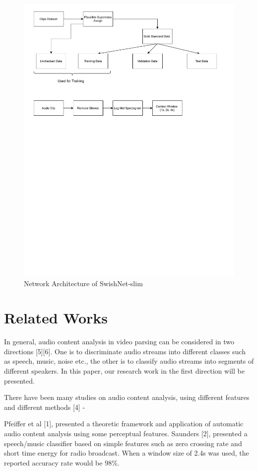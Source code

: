 \documentclass{article}
\begin{document}
\begin{figure}[!t]
	\centering
	\includegraphics[width=\textwidth, trim= 0 450 0 0, clip]{Pipeline.pdf}
	\caption{Network Architecture of SwishNet-slim}
	\label{fig:swishnet}
\end{figure}

\section{Related Works}
In general, audio content analysis in video parsing can be considered in two directions [5][6]. One is to discriminate audio streams into different classes such as speech, music, noise etc., the other is to classify audio streams into segments of different speakers. In this paper, our research work in the first direction will be presented. 

There have been many studies on audio content analysis, using different features and different methods [4] - 

Pfeiffer et al [1], presented a theoretic framework and application of automatic audio content analysis using some perceptual features. Saunders [2], presented a speech/music classifier based on simple features such as zero crossing rate and short time energy for radio broadcast. When a window size of 2.4s was used, the reported accuracy rate would be 98\%.  
\end{document}
